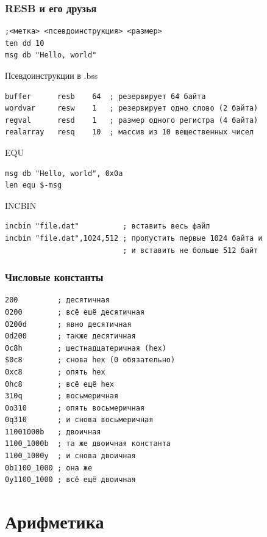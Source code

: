 \documentclass[utf8, russian]{beamer}
\begin{document}
    \begin{frame}[fragile]
        \frametitle{RESB и его друзья}\small
        \begin{verbatim}
;<метка> <псевдоинструкция> <размер> 
ten dd 10 
msg db "Hello, world"\end{verbatim}
        \begin{block}{Псевдоинструкции в .bss}
            \begin{verbatim}
buffer      resb    64  ; резервирует 64 байта
wordvar     resw    1   ; резервирует одно слово (2 байта)
regval      resd    1   ; размер одного регистра (4 байта)
realarray   resq    10  ; массив из 10 вещественных чисел\end{verbatim}
        \end{block}
        \begin{block}{EQU}
        \begin{verbatim}
msg db "Hello, world", 0x0a
len equ $-msg\end{verbatim}
        \end{block}
        \begin{block}{INCBIN}
        \begin{verbatim}
incbin "file.dat"          ; вставить весь файл
incbin "file.dat",1024,512 ; пропустить первые 1024 байта и
                           ; и вставить не больше 512 байт\end{verbatim}
        \end{block}
\end{frame}
    \begin{frame}[fragile]
        \frametitle{Числовые константы}
        \begin{verbatim}
200         ; десятичная
0200        ; всё ешё десятичная
0200d       ; явно десятичная
0d200       ; также десятичная
0c8h        ; шестнадцатеричная (hex)
$0c8        ; снова hex (0 обязательно)
0xc8        ; опять hex
0hc8        ; всё ещё hex
310q        ; восьмеричная
0o310       ; опять восьмеричная
0q310       ; и снова восьмеричная
11001000b   ; двоичная
1100_1000b  ; та же двоичная константа
1100_1000y  ; и снова двоичная
0b1100_1000 ; она же
0y1100_1000 ; всё ещё двоичная       
        \end{verbatim}
\end{frame}

    \section{Арифметика}
\end{document}
